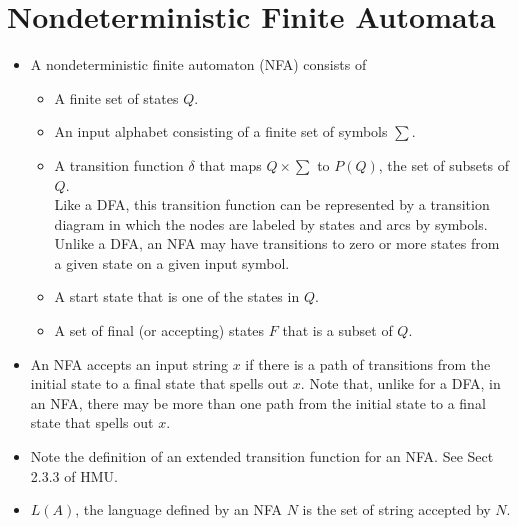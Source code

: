 \documentclass[]{article}
\begin{document}
\section{Nondeterministic Finite Automata}
  \begin{itemize}
    \item A nondeterministic finite automaton (NFA) consists of
      \begin{itemize}
        \item A finite set of states $Q$.
        \item An input alphabet consisting of a finite set of symbols $\sum$.
        \item A transition function $\delta$ that maps $Q \times \sum$ to $P(Q)$, 
        the set of subsets of $Q$. \\
        Like a DFA, this transition function can be represented by a transition 
        diagram in which the nodes are labeled by states and arcs by symbols. 
        Unlike a DFA, an NFA may have transitions to zero or more states from a 
        given state on a given input symbol.
        \item A start state that is one of the states in $Q$.
        \item A set of final (or accepting) states $F$ that is a subset of $Q$.
      \end{itemize}
    \item An NFA accepts an input string $x$ if there is a path of transitions 
    from the initial state to a final state that spells out $x$. Note that, 
    unlike for a DFA, in an NFA, there may be more than one path from the 
    initial state to a final state that spells out $x$.
    \item Note the definition of an extended transition function for an NFA. 
    See Sect 2.3.3 of HMU.
    \item $L(A)$, the language defined by an NFA $N$ is the set of string 
    accepted by $N$.
  \end{itemize}
  
\end{document}

